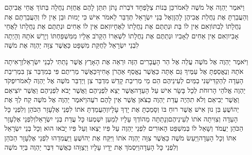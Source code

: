 \documentclass[../main/main.tex]{subfiles}
\begin{document}
\begin{multicols}{\ncols}
וַיֹּאמֶר יַהְוֶה אֶל מֹשֶׁה לֵּאמֹר\PreVerseSpace{}כֵּן בְּנוֹת צְלָפְחָד דֹּבְרֹת נָתֹן תִּתֵּן לָהֶם אֲחֻזַּת נַחֲלָה בְּתוֹךְ אֲחֵי אֲבִיהֶם וְהַעֲבַרְתָּ אֶת נַחֲלַת אֲבִיהֶן לָהֶן\PreVerseSpace{}וְאֶל בְּנֵי יִשְׂרָאֵל תְּדַבֵּר לֵאמֹר אִישׁ כִּי יָמוּת וּבֵן אֵין לוֹ וְהַעֲבַרְתֶּם אֶת נַחֲלָתוֹ לְבִתּוֹ\PreVerseSpace{}וְאִם אֵין לוֹ בַּת וּנְתַתֶּם אֶת נַחֲלָתוֹ לְאֶחָיו\PreVerseSpace{}וְאִם אֵין לוֹ אַחִים וּנְתַתֶּם אֶת נַחֲלָתוֹ לַאֲחֵי אָבִיו\PreVerseSpace{}וְאִם אֵין אַחִים לְאָבִיו וּנְתַתֶּם אֶת נַחֲלָתוֹ לִשְׁאֵרוֹ הַקָּרֹב אֵלָיו מִמִּשְׁפַּחְתּוֹ וְיָרַשׁ אֹתָהּ וְהָיְתָה לִבְנֵי יִשְׂרָאֵל לְחֻקַּת מִשְׁפָּט כַּאֲשֶׁר צִוָּה יַהְוֶה אֶת מֹשֶׁה\OpenSection{}\par
{}וַיֹּאמֶר יַהְוֶה אֶל מֹשֶׁה עֲלֵה אֶל הַר הָעֲבָרִים הַזֶּה וּרְאֵה אֶת הָאָרֶץ אֲשֶׁר נָתַתִּי לִבְנֵי יִשְׂרָאֵל\PreVerseSpace{}וְרָאִיתָה אֹתָהּ וְנֶאֱסַפְתָּ אֶל עַמֶּיךָ גַּם אָתָּה כַּאֲשֶׁר נֶאֱסַף אַהֲרֹן אָחִיךָ\PreVerseSpace{}כַּאֲשֶׁר מְרִיתֶם פִּי בְּמִדְבַּר צִן בִּמְרִיבַת הָעֵדָה לְהַקְדִּישֵׁנִי בַמַּיִם לְעֵינֵיהֶם הֵם מֵי מְרִיבַת קָדֵשׁ מִדְבַּר צִן \ClosedSection{}וַיְדַבֵּר מֹשֶׁה אֶל יַהְוֶה לֵאמֹר\PreVerseSpace{}יִפְקֹד יַהְוֶה אֱלֹהֵי הָרוּחֹת לְכָל בָּשָׂר אִישׁ עַל הָעֵדָה\PreVerseSpace{}אֲשֶׁר יֵצֵא לִפְנֵיהֶם וַאֲשֶׁר יָבֹא לִפְנֵיהֶם וַאֲשֶׁר יוֹצִיאֵם וַאֲשֶׁר יְבִיאֵם וְלֹא תִהְיֶה עֲדַת יַהְוֶה כַּצֹּאן אֲשֶׁר אֵין לָהֶם רֹעֶה\PreVerseSpace{}וַיֹּאמֶר יַהְוֶה אֶל מֹשֶׁה קַח לְךָ אֶת יְהוֹשֻׁעַ בִּן נוּן אִישׁ אֲשֶׁר רוּחַ בּוֹ וְסָמַכְתָּ אֶת יָדְךָ עָלָיו\PreVerseSpace{}וְהַעֲמַדְתָּ אֹתוֹ לִפְנֵי אֶלְעָזָר הַכֹּהֵן וְלִפְנֵי כָּל הָעֵדָה וְצִוִּיתָה אֹתוֹ לְעֵינֵיהֶם\PreVerseSpace{}וְנָתַתָּה מֵהוֹדְךָ עָלָיו לְמַעַן יִשְׁמְעוּ כָּל עֲדַת בְּנֵי יִשְׂרָאֵל\PreVerseSpace{}וְלִפְנֵי אֶלְעָזָר הַכֹּהֵן יַעֲמֹד וְשָׁאַל לוֹ בְּמִשְׁפַּט הָאוּרִים לִפְנֵי יַהְוֶה עַל פִּיו יֵצְאוּ וְעַל פִּיו יָבֹאוּ הוּא וְכָל בְּנֵי יִשְׂרָאֵל אִתּוֹ וְכָל הָעֵדָה\PreVerseSpace{}וַיַּעַשׂ מֹשֶׁה כַּאֲשֶׁר צִוָּה יַהְוֶה אֹתוֹ וַיִּקַּח אֶת יְהוֹשֻׁעַ וַיַּעֲמִדֵהוּ לִפְנֵי אֶלְעָזָר הַכֹּהֵן וְלִפְנֵי כָּל הָעֵדָה\PreVerseSpace{}וַיִּסְמֹךְ אֶת יָדָיו עָלָיו וַיְצַוֵּהוּ כַּאֲשֶׁר דִּבֶּר יַהְוֶה בְּיַד מֹשֶׁה\OpenSection{}\par

\end{multicols}
\end{document}
